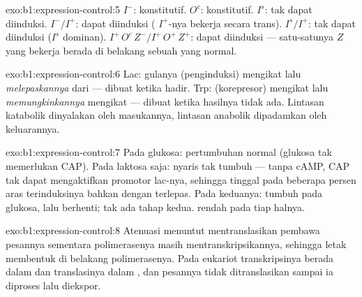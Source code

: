 \begin{solution}{exo:b1:expression-control:5}
$I^-$: konstitutif. $O^c$: konstitutif. $I^s$: tak dapat diinduksi.
$I^-/I^+$: dapat diinduksi ( $I^+$-nya bekerja secara trans).
$I^s/I^+$: tak dapat diinduksi ($I^s$ dominan).
$I^+\,O^c\,Z^- / I^+\,O^+\,Z^+$: dapat diinduksi --- satu-satunya $Z$
yang bekerja berada di belakang sebuah  yang normal.
\end{solution}

\begin{solution}{exo:b1:expression-control:6}
Lac: gulanya (penginduksi) mengikat  lalu
\emph{melepaskannya} dari  ---  dibuat ketika
 hadir. Trp:  (korepresor) mengikat 
lalu \emph{memungkinkannya} mengikat ---  dibuat ketika hasilnya
tidak ada. Lintasan katabolik dinyalakan oleh masukannya, lintasan
anabolik dipadamkan oleh keluarannya.
\end{solution}

\begin{solution}{exo:b1:expression-control:7}
Pada glukosa: pertumbuhan normal (glukosa tak memerlukan CAP). Pada
laktosa saja: nyaris tak tumbuh --- tanpa cAMP, CAP tak dapat
mengaktifkan promotor lac-nya, sehingga  tinggal pada beberapa
persen aras terinduksinya bahkan dengan  terlepas. Pada
keduanya: tumbuh pada glukosa, lalu berhenti; tak ada tahap kedua.
 rendah pada tiap halnya.
\end{solution}

\begin{solution}{exo:b1:expression-control:8}
Atenuasi menuntut  mentranslasikan pembawa pesannya sementara
polimerasenya masih mentranskripsikannya, sehingga letak 
membentuk  di belakang polimerasenya. Pada eukariot transkripsinya
berada dalam  dan translasinya dalam , dan pesannya
tidak ditranslasikan sampai ia diproses lalu diekspor.
\end{solution}

